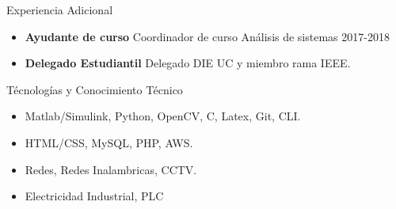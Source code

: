 \documentclass[]{mcdowellcv}
\begin{document}
	\begin{cvsection}{Experiencia Adicional}
		\begin{cvsubsection}{}{}{}	
			\begin{itemize}
				\item \textbf{Ayudante de curso} Coordinador de curso Análisis de sistemas 2017-2018
				\item \textbf{Delegado Estudiantil} Delegado DIE UC y miembro rama IEEE.
			\end{itemize}
		\end{cvsubsection}
	\end{cvsection}
	
	\begin{cvsection}{Técnologías y Conocimiento Técnico}
		\begin{cvsubsection}{}{}{}	
			\begin{itemize}
				\item Matlab/Simulink, Python, OpenCV, C, Latex, Git, CLI.
				\item HTML/CSS, MySQL, PHP, AWS.
				\item Redes, Redes Inalambricas, CCTV.
				\item Electricidad Industrial, PLC
			\end{itemize}
		\end{cvsubsection}
	\end{cvsection}
	
\end{document}
